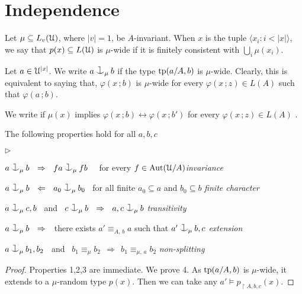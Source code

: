 \documentclass{amsproc}
\newcommand{\mylabel}[1]{{#1}\hfill}
\renewenvironment{itemize}
  {\begin{list}{$\triangleright$}{%
  \setlength{\parskip}{0mm}
  \setlength{\topsep}{.4\baselineskip}
  \setlength{\rightmargin}{0mm}
  \setlength{\listparindent}{0mm}
  \setlength{\itemindent}{0mm}
  \setlength{\labelwidth}{3ex}
  \setlength{\itemsep}{.2\baselineskip}
  \setlength{\parsep}{.2\baselineskip}
  \setlength{\partopsep}{0mm}
  \setlength{\labelsep}{1ex}
  \setlength{\leftmargin}{\labelwidth+\labelsep}
  \let\makelabel\mylabel}}{%
\end{list}}
\renewcommand*{\emph}[1]{%
   \smash{\tikz[baseline]\node[rectangle, fill=teal!25, rounded corners, inner xsep=0.5ex, inner ysep=0.2ex, anchor=base, minimum height = 2.7ex]{\strut #1};}}
\def\cnonfork{\mathbin{\raise1.8ex\rlap{\kern0.6ex\rule{0.6ex}{0.1ex}}\rlap{\kern1.1ex\rule{0.1ex}{1.9ex}}\raise-0.3ex\hbox{$\smile$} } }
\begin{document}
\section{Independence}

Let $\mu\subseteq L_v(\EuScript U)$, where $|v|=1$, be $A$-invariant.
When $x$ is the tuple $\langle x_i:i<|x|\rangle$, we say that $p(x)\subseteq L(\EuScript U)$ is $\mu$-wide if it is finitely consistent with $\bigcup_i\mu(x_i)$.

Let $a\in\EuScript U^{|x|}$.
We write $a\cnonfork_\mu b$ if the type ${\rm tp}(a/A,b)$ is $\mu$-wide. 
Clearly, this is equivalent to saying that,  $\varphi(x\,;b)$ is $\mu$-wide for every $\varphi(x\,;z)\in L(A)$ such that $\varphi(a\,;b)$.

We write\emph{$b\equiv_\mu b'$\/} if $\mu(x)$ implies $\varphi(x\,;b)\leftrightarrow\varphi(x\,;b')$ for every $\varphi(x\,;z)\in L(A)$
.

\begin{lemma}\label{lem_coheir_independence}
  The following properties hold for all $a,b,c$
  \begin{itemize}
  \item[1.] $a\cnonfork_\mu b\ \ \Rightarrow\ \ fa\cnonfork_\mu fb$ \ \ 
            for every $f\in{\rm Aut}(\EuScript U/A)$\hfill \textit{invariance}
  \item[2.] $a\cnonfork_\mu b\ \ \Leftarrow\ \  a_0\cnonfork_\mu b_0$
            \ for all finite $a_0\subseteq a$  and $b_0\subseteq b$ \hfill\textit{finite character}
  \item[3.] $a\cnonfork_\mu c,b$ \ and \ 
            $c\cnonfork_\mu b\ \ \Rightarrow\ \ a,c\cnonfork_\mu b$
            \hfill\hfill\hfill\textit{transitivity}
  \item[4.] $a\cnonfork_\mu b\ \ \Rightarrow\ \ $ 
            there exists $a'\equiv_{A,\,b}a$ such that 
            $a'\cnonfork_\mu b,c$
            \textit{extension}
  \item[5.] $a\cnonfork_\mu b_1,b_2$ \ and \ 
  $b_1\equiv_\mu b_2\ \ \Rightarrow\ \ b_1\equiv_{\mu,\,a}b_2$
            \hspace{\stretch{20}}\textit{non-splitting}
  \end{itemize}
\end{lemma}

\begin{proof}
  Properties 1,2,3 are immediate.
  We prove 4. 
  As ${\rm tp}(a/A,b)$ is $\mu$-wide, it extends to a $\mu$-random type $p(x)$.
  Then we can take any $a'\models p_{\restriction A,b,c}(x)$.
\end{proof}
\end{document}
